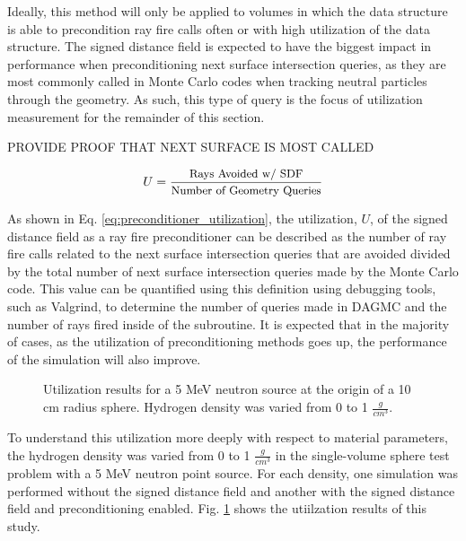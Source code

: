 Ideally, this method will only be applied to volumes in which the data
structure is able to precondition ray fire calls often or with high utilization
of the data structure. The signed distance field is expected to have the biggest
impact in performance when preconditioning next surface intersection queries, as
they are most commonly called in Monte Carlo codes when tracking neutral particles
through the geometry. As such, this type of query is the focus of utilization
measurement for the remainder of this section.

PROVIDE PROOF THAT NEXT SURFACE IS MOST CALLED

\begin{equation}
  U = \frac{ \small \text{Rays Avoided w/ SDF} }{ \small \text{Number of Geometry Queries} } 
   \label{eq:preconditioner_utilization}
\end{equation}

As shown in Eq. \ref{eq:preconditioner_utilization}, the utilization, $U$, of
the signed distance field as a ray fire preconditioner can be described as the
number of ray fire calls related to the next surface intersection queries that
are avoided divided by the total number of next surface intersection queries
made by the Monte Carlo code. This value can be quantified using this definition
using debugging tools, such as Valgrind, to determine the number of queries made
in DAGMC and the number of rays fired inside of the subroutine.  It is expected
that in the majority of cases, as the utilization of preconditioning methods
goes up, the performance of the simulation will also improve.



\begin{figure}[ht]
  \centering
  {\textwidth}
  \caption{Utilization results for a 5 MeV neutron source at the origin of a 10 cm radius
    sphere. Hydrogen density was varied from 0 to 1 $\frac{g}{cm^3}$.}
  \label{fig:sphere_hydrogen_density_study_util}
\end{figure}

To understand this utilization more deeply with respect to material parameters,
the hydrogen density was varied from 0 to 1 $\frac{g}{cm^3}$ in the single-volume
sphere test problem with a 5 MeV neutron point source. For each density, one
simulation was performed without the signed distance field and another with the
signed distance field and preconditioning enabled. Fig.
\ref{fig:sphere_hydrogen_density_study_util} shows the utiilzation results of this study. 

